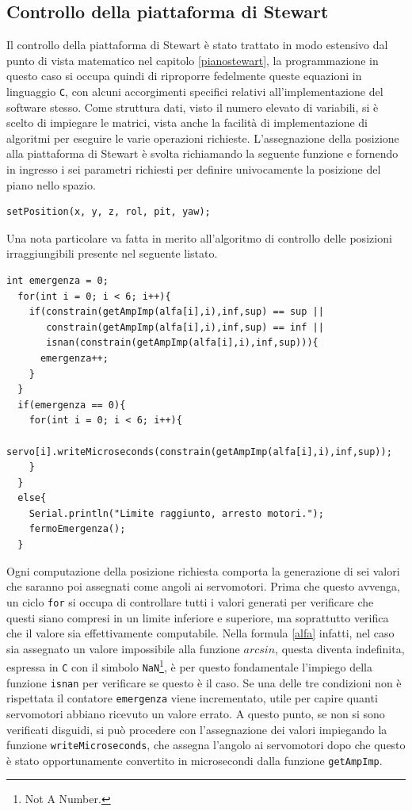 \documentclass[12pt,twoside,openright]{report}
\begin{document}
\subsection{Controllo della piattaforma di Stewart}
Il controllo della piattaforma di Stewart è stato trattato in modo estensivo dal punto di vista matematico nel capitolo \ref{pianostewart}, la programmazione in questo caso si occupa quindi di riproporre fedelmente queste equazioni in linguaggio \texttt{C}, con alcuni accorgimenti specifici relativi all'implementazione del software stesso. Come struttura dati, visto il numero elevato di variabili, si è scelto di impiegare le matrici, vista anche la facilità di implementazione di algoritmi per eseguire le varie operazioni richieste. 
L'assegnazione della posizione alla piattaforma di Stewart è svolta richiamando la seguente funzione e fornendo in ingresso i sei parametri richiesti per definire univocamente la posizione del piano nello spazio.
\begin{verbatim}
setPosition(x, y, z, rol, pit, yaw);
\end{verbatim}
Una nota particolare va fatta in merito all'algoritmo di controllo delle posizioni irraggiungibili presente nel seguente listato.
\begin{verbatim}
int emergenza = 0;
  for(int i = 0; i < 6; i++){
    if(constrain(getAmpImp(alfa[i],i),inf,sup) == sup ||
       constrain(getAmpImp(alfa[i],i),inf,sup) == inf ||
       isnan(constrain(getAmpImp(alfa[i],i),inf,sup))){     
      emergenza++;
    }
  }
  if(emergenza == 0){
    for(int i = 0; i < 6; i++){
        servo[i].writeMicroseconds(constrain(getAmpImp(alfa[i],i),inf,sup));
    }
  }
  else{
    Serial.println("Limite raggiunto, arresto motori.");
    fermoEmergenza();
  }
\end{verbatim}
Ogni computazione della posizione richiesta comporta la generazione di sei valori che saranno poi assegnati come angoli ai servomotori. Prima che questo avvenga, un ciclo \texttt{for} si occupa di controllare tutti i valori generati per verificare che questi siano compresi in un limite inferiore e superiore, ma soprattutto verifica che il valore sia effettivamente computabile. Nella formula \eqref{alfa} infatti, nel caso sia assegnato un valore impossibile alla funzione $arcsin$, questa diventa indefinita, espressa in \texttt{C} con il simbolo \texttt{NaN}\footnote{Not A Number.}, è per questo fondamentale l'impiego della funzione \texttt{isnan} per verificare se questo è il caso. Se una delle tre condizioni non è rispettata il contatore \texttt{emergenza} viene incrementato, utile per capire quanti servomotori abbiano ricevuto un valore errato. A questo punto, se non si sono verificati disguidi, si può procedere con l'assegnazione dei valori impiegando la funzione \texttt{writeMicroseconds}, che assegna l'angolo ai servomotori dopo che questo è stato opportunamente convertito in microsecondi dalla funzione \texttt{getAmpImp}.
\end{document}
